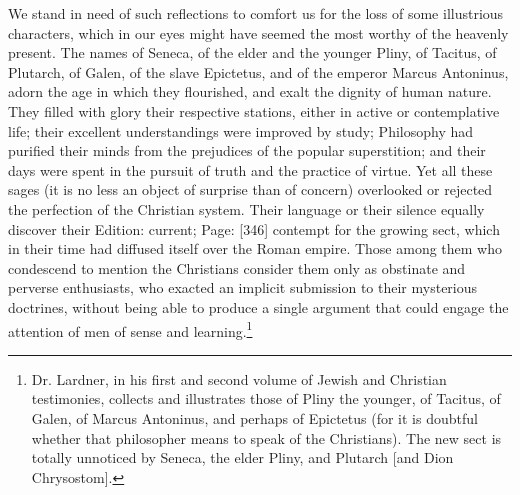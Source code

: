 We stand in need of such reflections to comfort us for the loss of some illustrious characters, which in our eyes might have seemed the most worthy of the heavenly present. The names of Seneca, of the elder and the younger Pliny, of Tacitus, of Plutarch, of Galen, of the slave Epictetus, and of the emperor Marcus Antoninus, adorn the age in which they flourished, and exalt the dignity of human nature. They filled with glory their respective stations, either in active or contemplative life; their excellent understandings were improved by study; Philosophy had purified their minds from the prejudices of the popular superstition; and their days were spent in the pursuit of truth and the practice of virtue. Yet all these sages (it is no less an object of surprise than of concern) overlooked or rejected the perfection of the Christian system. Their language or their silence equally discover their Edition: current; Page: [346] contempt for the growing sect, which in their time had diffused itself over the Roman empire. Those among them who condescend to mention the Christians consider them only as obstinate and perverse enthusiasts, who exacted an implicit submission to their mysterious doctrines, without being able to produce a single argument that could engage the attention of men of sense and learning.\footnote{Dr. Lardner, in his first and second volume of Jewish and Christian testimonies, collects and illustrates those of Pliny the younger, of Tacitus, of Galen, of Marcus Antoninus, and perhaps of Epictetus (for it is doubtful whether that philosopher means to speak of the Christians). The new sect is totally unnoticed by Seneca, the elder Pliny, and Plutarch [and Dion Chrysostom].}

